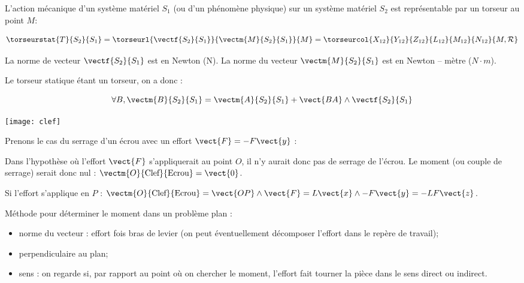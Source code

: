 \begin{defi}

L'action mécanique d'un système matériel $S_1$ (ou d'un phénomène physique) sur un système matériel $S_2$ est représentable par un torseur au point $M$:

$$
\torseurstat{T}{S_2}{S_1}
=\torseurl{\vectf{S_2}{S_1}}{\vectm{M}{S_2}{S_1}}{M}
=\torseurcol{X_{12}}{Y_{12}}{Z_{12}}{L_{12}}{M_{12}}{N_{12}}{M,\mathcal{R}}
$$
\end{defi}
\begin{remarque}
La norme de vecteur $\vectf{S_2}{S_1}$ est en Newton (N). La norme du vecteur $\vectm{M}{S_2}{S_1}$ est en Newton -- mètre ($N\cdot m$).
\end{remarque}

\begin{prop}[Varignon]
Le torseur statique étant un torseur, on a donc : 

$$
\forall B, \vectm{B}{S_2}{S_1} = \vectm{A}{S_2}{S_1} + \vect{BA} \wedge \vectf{S_2}{S_1}
$$
\end{prop}



\begin{marginfigure}
\texttt{[image: clef]}
\end{marginfigure}

\begin{remarque}

Prenons le cas du serrage d'un écrou avec un effort $\vect{F}=-F\vect{y}$ :


Dans l'hypothèse où l'effort $\vect{F}$ s'appliquerait au point $O$, il n'y aurait donc pas de serrage de l'écrou. Le moment (ou couple de serrage) serait donc nul : $\vectm{O}{\text{Clef}}{\text{Ecrou}}=\vect{0}$.

Si l'effort s'applique en $P$ :
$\vectm{O}{\text{Clef}}{\text{Ecrou}}=\vect{OP}\wedge\vect{F}
=L\vect{x}\wedge-F\vect{y}=-LF\vect{z}$.

Méthode pour déterminer le moment dans un problème plan : 
\begin{itemize}
\item norme du vecteur : effort fois bras de levier (on peut éventuellement décomposer l'effort dans le repère de travail);
\item perpendiculaire au plan;
\item sens : on regarde si, par rapport au point où on chercher le moment, l'effort fait tourner la pièce dans le sens direct ou indirect. 
\end{itemize}

\end{remarque}
